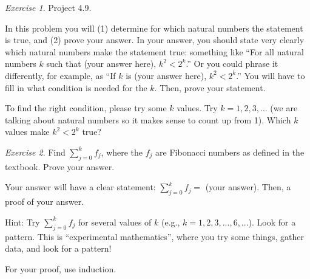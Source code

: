 \documentclass[12pt,oneside]{amsart}
\theoremstyle{remark}
\newtheorem{exer}{Exercise}
\begin{document}
%
%
%
%

\newpage
\begin{exer}
Project 4.9.

In this problem you will (1) determine for which natural numbers the statement is true, and (2) prove your answer. In your answer, you should state very clearly which natural numbers make the statement true: something like “For all natural numbers $k$ such that (your answer here), $k^2 < 2^k$.” Or you could phrase it differently, for example, as “If $k$ is (your answer here), $k^2 < 2^k$.” You will have to fill in what condition is needed for the $k$. Then, prove your statement.

To find the right condition, please try some $k$ values. Try  $k = 1, 2, 3, ...$ (we are talking about natural numbers so it makes sense to count up from 1). Which $k$ values make
$k^2 < 2^k$ true?
\end{exer}

%
%
%
%

\newpage
\begin{exer}
Find $\sum_{j = 0}^k f_j$, where the $f_j$ are Fibonacci numbers as defined in the textbook. Prove your answer.

Your answer will have a clear statement: $\sum_{j = 0}^k f_j =$ (your answer). Then, a proof of your answer.

Hint: Try $\sum_{j = 0}^k f_j$ for several values of $k$ (e.g., $k = 1, 2, 3, ..., 6, ...$). Look for a pattern. This is “experimental mathematics”, where you try some things, gather data, and look for a pattern!

For your proof, use induction.
\end{exer}
\end{document}
